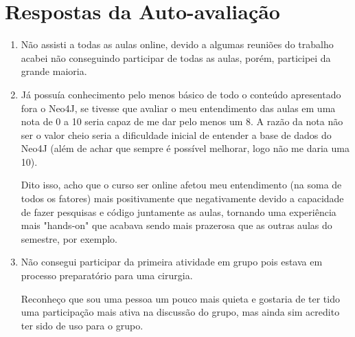 \documentclass{article}
\begin{document}
\begin{enumerate}
\end{enumerate}

\section{Respostas da Auto-avaliação}
\begin{enumerate}
\item Não assisti a todas as aulas online, devido a algumas reuniões do trabalho acabei não conseguindo participar de todas as aulas, porém, participei da grande maioria.
\item Já possuía conhecimento pelo menos básico de todo o conteúdo apresentado fora o Neo4J, se tivesse que avaliar o meu entendimento das aulas em uma nota de 0 a 10 seria capaz de me dar pelo menos um 8. A razão da nota não ser o valor cheio seria a dificuldade inicial de entender a base de dados do Neo4J (além de achar que sempre é possível melhorar, logo não me daria uma 10).

Dito isso, acho que o curso ser online afetou meu entendimento (na soma de todos os fatores) mais positivamente que negativamente devido a capacidade de fazer pesquisas e código juntamente as aulas, tornando uma experiência mais "hands-on" que acabava sendo mais prazerosa que as outras aulas do semestre, por exemplo.
\item Não consegui participar da primeira atividade em grupo pois estava em processo preparatório para uma cirurgia. 

Reconheço que sou uma pessoa um pouco mais quieta e gostaria de ter tido uma participação mais ativa na discussão do grupo, mas ainda sim acredito ter sido de uso para o grupo.


\end{enumerate}
\end{document}

